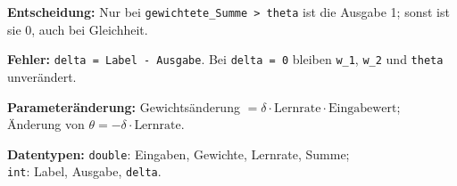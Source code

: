 \documentclass[11pt,a4paper]{article}
\begin{document}
\begin{merke}[title=Anpassung im Fehlerfall]
\small
\textbf{Entscheidung:} Nur bei \texttt{gewichtete\_Summe > theta} ist die Ausgabe 1;
sonst ist sie 0, auch bei Gleichheit.\par
\textbf{Fehler:} \texttt{delta = Label - Ausgabe}.
Bei \texttt{delta = 0} bleiben \texttt{w\_1}, \texttt{w\_2} und \texttt{theta} unverändert.\par
\textbf{Parameteränderung:} Gewichtsänderung $=\delta\cdot\text{Lernrate}\cdot\text{Eingabewert}$;\quad
Änderung von $\theta=-\delta\cdot\text{Lernrate}$.\par
\textbf{Datentypen:} \texttt{double}: Eingaben, Gewichte, Lernrate, Summe;\\
\texttt{int}: Label, Ausgabe, \texttt{delta}.
\end{merke}
\end{document}
